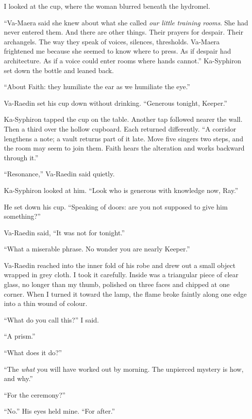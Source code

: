 I looked at the cup, where the woman blurred beneath the hydromel.\par

``Va-Maera said she knew about what she called \textit{our little training rooms}. She had never entered them. And there are other things. Their prayers for despair. Their archangels. The way they speak of voices, silences, thresholds. Va-Maera frightened me because she seemed to know where to press. As if despair had architecture. As if a voice could enter rooms where hands cannot.'' Ka-Syphiron set down the bottle and leaned back.\par

``About Faith: they humiliate the ear as we humiliate the eye.''\par

Va-Raedin set his cup down without drinking. ``Generous tonight, Keeper.''\par

Ka-Syphiron tapped the cup on the table. Another tap followed nearer the wall. Then a third over the hollow cupboard. Each returned differently. ``A corridor lengthens a note; a vault returns part of it late. Move five singers two steps, and the room may seem to join them. Faith hears the alteration and works backward through it.''\par

``Resonance,'' Va-Raedin said quietly.\par

Ka-Syphiron looked at him. ``Look who is generous with knowledge now, Ray.''\par

He set down his cup. ``Speaking of doors: are you not supposed to give him something?''\par

Va-Raedin said, ``It was not for tonight.''\par

``What a miserable phrase. No wonder you are nearly Keeper.''\par

Va-Raedin reached into the inner fold of his robe and drew out a small object wrapped in grey cloth. I took it carefully. Inside was a triangular piece of clear glass, no longer than my thumb, polished on three faces and chipped at one corner. When I turned it toward the lamp, the flame broke faintly along one edge into a thin wound of colour.\par

``What do you call this?'' I said.\par
``A prism.''\par
``What does it do?''\par
``The \emph{what} you will have worked out by morning. The unpierced mystery is how, and why.''\par
``For the ceremony?''\par
``No.'' His eyes held mine. ``For after.''\par

